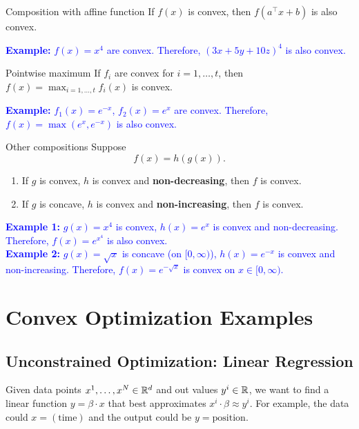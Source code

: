 \documentclass[../open-optimization/open-optimization.tex]{subfiles}
\begin{document}
\begin{general}{Composition with affine function}{}
If $f(x)$ is convex, then $f(a^\top x + b)$ is also convex.

\textcolor{blue}{\textbf{Example: } $f(x) = x^4$ are convex.  Therefore, $(3x + 5y + 10z)^4$ is also convex.}
\end{general}

\begin{general}{Pointwise maximum}{}
If $f_i$ are convex for $i=1, \dots, t$, then $f(x) = \max_{i=1, \dots, t} f_i(x)$ is convex.

\textcolor{blue}{\textbf{Example: } $f_1(x) = e^{-x}$, $f_2(x) = e^{x}$ are convex.  Therefore, $f(x) = \max(e^x, e^{-x})$ is also convex.}
\end{general}

\begin{general}{Other compositions}{}
Suppose 
$$
f(x) = h(g(x)).
$$
\begin{enumerate}
\item If $g$ is convex, $h$ is convex and \textbf{non-decreasing}, then $f$ is convex.
\item If $g$ is concave, $h$ is convex and \textbf{non-increasing}, then $f$ is convex.
\end{enumerate}

\textcolor{blue}{\textbf{Example 1: } $g(x) = x^4$ is convex, $h(x) = e^{x}$ is convex and non-decreasing.  Therefore, $f(x) = e^{x^4}$ is also convex.}\\

\textcolor{blue}{\textbf{Example 2: } $g(x) = \sqrt{x}$ is concave (on $[0,\infty)$), $h(x) = e^{-x}$ is convex and non-increasing.  Therefore, $f(x) = e^{-\sqrt{x}}$ is convex on $x \in [0,\infty)$.}
\end{general}







\section{Convex Optimization Examples}
\subsection{Unconstrained Optimization: Linear Regression}

Given data points $x^1, \dots, x^N \in {\mathbb{R}}^d$ and out values $y^i \in {\mathbb{R}}$, we want to find a linear function $y = \beta \cdot x$ that best approximates $x^i \cdot \beta \approx y^i$.  For example, the data could $x = (\text{time})$ and the output could be $y = \text{position}$.  
\end{document}
